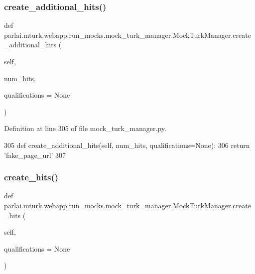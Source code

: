 \subsubsection{\texorpdfstring{create\+\_\+additional\+\_\+hits()}{create\_additional\_hits()}}
{\footnotesize\ttfamily def parlai.\+mturk.\+webapp.\+run\+\_\+mocks.\+mock\+\_\+turk\+\_\+manager.\+Mock\+Turk\+Manager.\+create\+\_\+additional\+\_\+hits (\begin{DoxyParamCaption}\item[{}]{self,  }\item[{}]{num\+\_\+hits,  }\item[{}]{qualifications = {\ttfamily None} }\end{DoxyParamCaption})}



Definition at line 305 of file mock\+\_\+turk\+\_\+manager.\+py.


\begin{DoxyCode}
305     \textcolor{keyword}{def }create\_additional\_hits(self, num\_hits, qualifications=None):
306         \textcolor{keywordflow}{return} \textcolor{stringliteral}{'fake\_page\_url'}
307 
\end{DoxyCode}
\mbox{\label{classparlai_1_1mturk_1_1webapp_1_1run__mocks_1_1mock__turk__manager_1_1MockTurkManager_a1dca7b716d9a3868b563101ee76f7503}} 
\subsubsection{\texorpdfstring{create\+\_\+hits()}{create\_hits()}}
{\footnotesize\ttfamily def parlai.\+mturk.\+webapp.\+run\+\_\+mocks.\+mock\+\_\+turk\+\_\+manager.\+Mock\+Turk\+Manager.\+create\+\_\+hits (\begin{DoxyParamCaption}\item[{}]{self,  }\item[{}]{qualifications = {\ttfamily None} }\end{DoxyParamCaption})}



